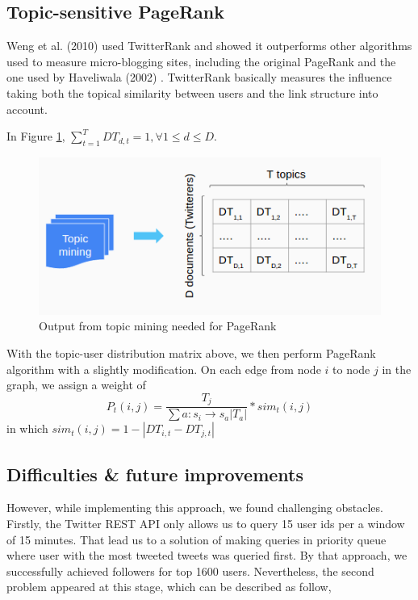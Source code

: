 \documentclass[11pt]{article}
\begin{document}
\subsection{Topic-sensitive PageRank}
Weng et al. (2010) used  TwitterRank and showed it outperforms other algorithms used to measure micro-blogging sites, including the original PageRank and the one used by Haveliwala (2002) \cite{haveliwala_2002}. TwitterRank basically measures the influence taking both the topical similarity between users and the link structure into account.

In Figure \ref{fig:topic_2_pagerank}, $\sum_{t=1}^{T}{DT_{d,t}} = 1, \forall 1\le d\le D$.

\begin{figure}[H]
	\centering
	\includegraphics[scale=0.7]{topic_2_pagerank}
	\caption{Output from topic mining needed for PageRank}
	\label{fig:topic_2_pagerank}
\end{figure}

With the topic-user distribution matrix above, we then perform PageRank algorithm with a slightly modification. On each edge from node $i$ to node $j$ in the graph, we assign a weight of
\[P_t(i,j)=\frac{T_j}{\sum{a:s_i\to s_a|T_a|}}*sim_t(i,j)\]
in which $sim_t(i,j)=1-|DT_{i,t}-DT_{j,t}|$

\subsection{Difficulties \& future improvements}

However, while implementing this approach, we found challenging obstacles. Firstly, the Twitter REST API only allows us to query 15 user ids per a window of 15 minutes. That lead us to a solution of making queries in priority queue where user with the most tweeted tweets was queried first. By that approach, we successfully achieved followers for top 1600 users. Nevertheless, the second problem appeared at this stage, which can be described as follow,
\end{document}
